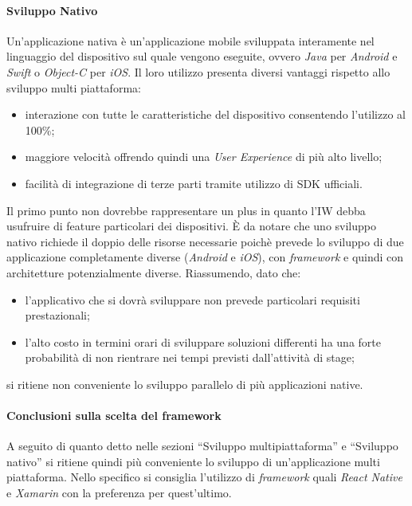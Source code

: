 \paragraph{Sviluppo Nativo}
Un’applicazione nativa è un’applicazione mobile sviluppata interamente nel linguaggio del dispositivo sul quale vengono eseguite, ovvero \emph{Java} per \emph{Android} e \emph{Swift} o \emph{Object-C} per \emph{iOS}. Il loro utilizzo presenta diversi vantaggi rispetto allo sviluppo multi piattaforma:
\begin{itemize}
    \item interazione con tutte le caratteristiche del dispositivo consentendo l’utilizzo al 100\%;
    \item maggiore velocità offrendo quindi una \emph{User Experience} di più alto livello;
    \item facilità di integrazione di terze parti tramite utilizzo di SDK ufficiali. 
\end{itemize}
Il primo punto non dovrebbe rappresentare un plus in quanto l’IW debba usufruire di feature particolari dei dispositivi. 
È da notare che uno sviluppo nativo richiede il doppio delle risorse necessarie poichè prevede lo sviluppo di due applicazione completamente diverse (\emph{Android} e \emph{iOS}), con \emph{framework} e quindi con architetture potenzialmente diverse. 
Riassumendo, dato che: 
\begin{itemize}
    \item l’applicativo che si dovrà sviluppare non prevede particolari requisiti prestazionali;
    \item l’alto costo in termini orari di sviluppare soluzioni differenti ha una forte probabilità di non rientrare nei tempi previsti dall’attività di stage;
\end{itemize}
 si ritiene non conveniente lo sviluppo parallelo di più applicazioni native. 
\paragraph{Conclusioni sulla scelta del framework}
A seguito di quanto detto nelle sezioni “Sviluppo multipiattaforma” e “Sviluppo nativo” si ritiene quindi più conveniente lo sviluppo di un’applicazione multi piattaforma. Nello specifico si consiglia l’utilizzo di \emph{framework} quali \emph{React Native} e \emph{Xamarin} con la preferenza per quest’ultimo.
